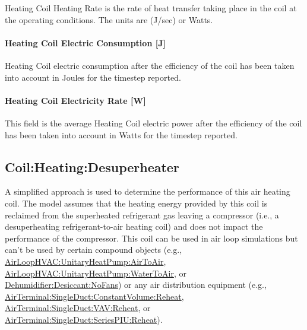 Heating Coil Heating Rate is the rate of heat transfer taking place in the coil at the operating conditions. The units are (J/sec) or Watts.

\paragraph{Heating Coil Electric Consumption {[}J{]}}\label{heating-coil-electric-consumption-j}

Heating Coil electric consumption after the efficiency of the coil has been taken into account in Joules for the timestep reported.

\paragraph{Heating Coil Electricity Rate {[}W{]}}\label{heating-coil-electric-power-w-1}

This field is the average Heating Coil electric power after the efficiency of the coil has been taken into account in Watts for the timestep reported.

\subsection{Coil:Heating:Desuperheater}\label{coilheatingdesuperheater}

A simplified approach is used to determine the performance of this air heating coil. The model assumes that the heating energy provided by this coil is reclaimed from the superheated refrigerant gas leaving a compressor (i.e., a desuperheating refrigerant-to-air heating coil) and does not impact the performance of the compressor. This coil can be used in air loop simulations but can't be used by certain compound objects (e.g., \hyperref[airloophvacunitaryheatpumpairtoair]{AirLoopHVAC:UnitaryHeatPump:AirToAir}, \hyperref[airloophvacunitaryheatpumpwatertoair]{AirLoopHVAC:UnitaryHeatPump:WaterToAir}, or \hyperref[dehumidifierdesiccantnofans]{Dehumidifier:Desiccant:NoFans}) or any air distribution equipment (e.g., \hyperref[airterminalsingleductconstantvolumereheat]{AirTerminal:SingleDuct:ConstantVolume:Reheat}, \hyperref[airterminalsingleductvavreheat]{AirTerminal:SingleDuct:VAV:Reheat}, or \hyperref[airterminalsingleductseriespiureheat]{AirTerminal:SingleDuct:SeriesPIU:Reheat}).


